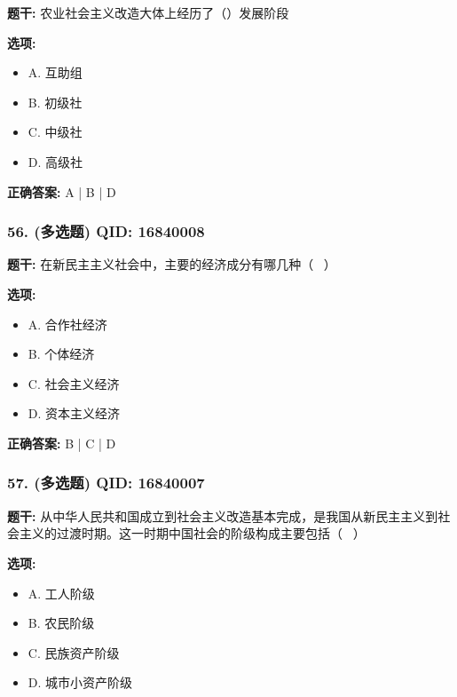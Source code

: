 \documentclass[12pt,UTF8]{ctexart}
\begin{document}
\textbf{题干:}
农业社会主义改造大体上经历了（）发展阶段

\textbf{选项:}
\begin{itemize}[leftmargin=*]

  \item A. 互助组

  \item B. 初级社

  \item C. 中级社

  \item D. 高级社

\end{itemize}

\textbf{正确答案:}
A | B | D

\vspace{0.3em}\hrulefill\vspace{0.7em}

\subsubsection*{56. (多选题) \small QID: 16840008}

\textbf{题干:}
在新民主主义社会中，主要的经济成分有哪几种（  ）

\textbf{选项:}
\begin{itemize}[leftmargin=*]

  \item A. 合作社经济

  \item B. 个体经济

  \item C. 社会主义经济

  \item D. 资本主义经济

\end{itemize}

\textbf{正确答案:}
B | C | D

\vspace{0.3em}\hrulefill\vspace{0.7em}

\subsubsection*{57. (多选题) \small QID: 16840007}

\textbf{题干:}
从中华人民共和国成立到社会主义改造基本完成，是我国从新民主主义到社会主义的过渡时期。这一时期中国社会的阶级构成主要包括（  ）

\textbf{选项:}
\begin{itemize}[leftmargin=*]

  \item A. 工人阶级

  \item B. 农民阶级

  \item C. 民族资产阶级

  \item D. 城市小资产阶级

\end{itemize}
\end{document}
